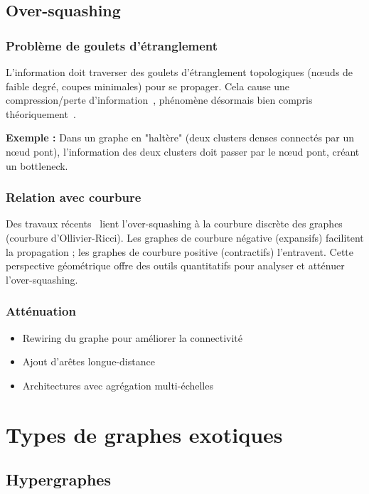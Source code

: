 \subsection{Over-squashing}

\subsubsection{Problème de goulets d'étranglement}

L'information doit traverser des goulets d'étranglement topologiques (nœuds de faible degré, coupes minimales) pour se propager. Cela cause une compression/perte d'information~\cite{Alon2021}, phénomène désormais bien compris théoriquement~\cite{DiGiovanni2023,Black2023}.

\textbf{Exemple :}
Dans un graphe en "haltère" (deux clusters denses connectés par un nœud pont), l'information des deux clusters doit passer par le nœud pont, créant un bottleneck.

\subsubsection{Relation avec courbure}

Des travaux récents~\cite{Topping2022,Nguyen2023} lient l'over-squashing à la courbure discrète des graphes (courbure d'Ollivier-Ricci). Les graphes de courbure négative (expansifs) facilitent la propagation ; les graphes de courbure positive (contractifs) l'entravent. Cette perspective géométrique offre des outils quantitatifs pour analyser et atténuer l'over-squashing.

\subsubsection{Atténuation}

\begin{itemize}
    \item Rewiring du graphe pour améliorer la connectivité
    \item Ajout d'arêtes longue-distance
    \item Architectures avec agrégation multi-échelles
\end{itemize}

\section{Types de graphes exotiques}

\subsection{Hypergraphes}

